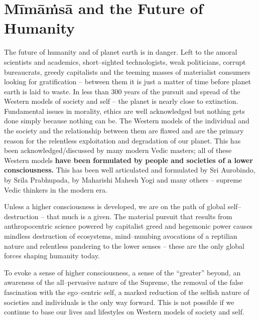 \newpage


\section*{Mīmāṁsā and the Future of Humanity}

\vskip -6pt

The future of humanity and of planet earth is in danger. Left to the amoral scientists and academics, short–sighted technologists, weak politicians, corrupt bureaucrats, greedy capitalists and the teeming masses of materialist consumers looking for gratification – between them it is just a matter of time before planet earth is laid to waste. In less than 300 years of the pursuit and spread of the Western models of society and self – the planet is nearly close to extinction. Fundamental issues in morality, ethics are well acknowledged but nothing gets done simply because nothing can be. The Western models of the individual and the society and the relationship between them are flawed and are the primary reason for the relentless exploitation and degradation of our planet. This has been acknowledged/discussed by many modern Vedic masters; all of these Western models \textbf{have been formulated by people and societies of a lower consciousness.} This has been well articulated and formulated by Sri Aurobindo, by Srila Prabhupada, by Maharishi Mahesh Yogi and many others – supreme Vedic thinkers in the modern era.

Unless a higher consciousness is developed, we are on the path of global self–destruction – that much is a given. The material pursuit that results from anthropocentric science powered by capitalist greed and hegemonic power causes mindless destruction of ecosystems, mind–numbing avocations of a reptilian nature and relentless pandering to the lower senses – these are the only global forces shaping humanity today.

To evoke a sense of higher consciousness, a sense of the “greater” beyond, an awareness of the all–pervasive nature of the Supreme, the removal of the false fascination with the ego–centric self, a marked reduction of the selfish nature of societies and individuals is the only way forward. This is not possible if we continue to base our lives and lifestyles on Western models of society and self.

